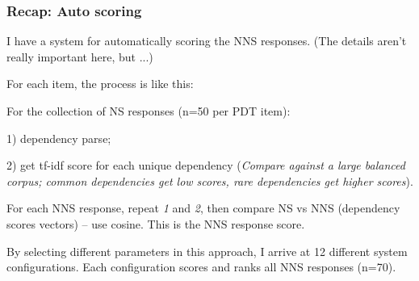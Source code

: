\documentclass[xcolor={dvipsnames}]{beamer}
\begin{document}
\begin{frame}
\frametitle{Recap: Auto scoring}
\scriptsize
I have a system for automatically scoring the NNS responses. (The details aren't really important here, but ...)
\bigskip

For each item, the process is like this:

For the collection of NS responses  (n=50 per PDT item):

1) dependency parse;

2) get tf-idf score for each unique dependency (\textit{Compare against a large balanced corpus; common dependencies get low scores, rare dependencies get higher scores}).
\bigskip

For each NNS response, repeat \textit{1} and \textit{2}, then compare NS vs NNS (dependency scores vectors) -- use cosine. This is the NNS response score.

\bigskip

By selecting different parameters in this approach, I arrive at 12 different system configurations. Each configuration scores and ranks all NNS responses (n=70).

\end{frame}
\end{document}
